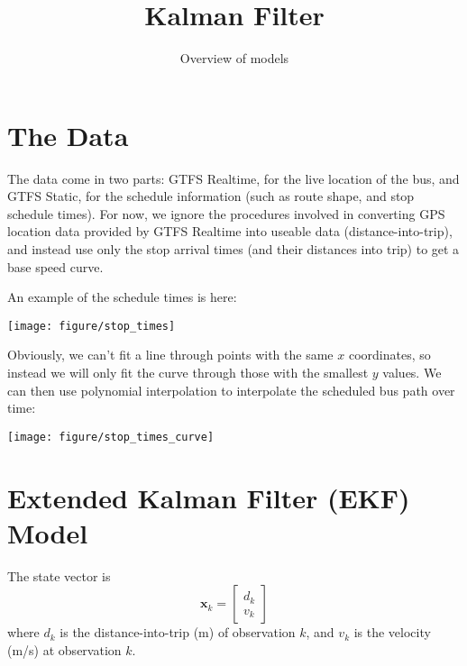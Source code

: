 \documentclass[11pt]{article}\usepackage[]{graphicx}\usepackage[]{color}
\title{Kalman Filter}
\author{Overview of models}
\date{}
\newenvironment{knitrout}{}{} %
\newcommand{\bx}{\boldsymbol{x}}
\begin{document}
\maketitle



\section{The Data}

The data come in two parts: GTFS Realtime, for the live location of the bus, and GTFS
Static, for the schedule information (such as route shape, and stop schedule times).
For now, we ignore the procedures involved in converting GPS location data provided by
GTFS Realtime into useable data (distance-into-trip), and instead use only the stop arrival
times (and their distances into trip) to get a base speed curve.

An example of the schedule times is here:
\begin{knitrout}
\color{fgcolor}

{\centering \texttt{[image: figure/stop\_times]}

}



\end{knitrout}

Obviously, we can't fit a line through points with the same $x$ coordinates, so instead we will only fit the curve
through those with the smallest $y$ values.
We can then use polynomial interpolation to interpolate the scheduled bus path over time:
\begin{knitrout}
\color{fgcolor}

{\centering \texttt{[image: figure/stop\_times\_curve]}

}



\end{knitrout}




\section{Extended Kalman Filter (EKF) Model}

The state vector is
\begin{equation}
  \label{eq:state-vector}
  \bx_k =
  \begin{bmatrix}
    d_k \\ v_k
  \end{bmatrix}
\end{equation}
where $d_k$ is the distance-into-trip (m) of observation $k$, and $v_k$ is the velocity (m/s) at
observation $k$.
\end{document}
